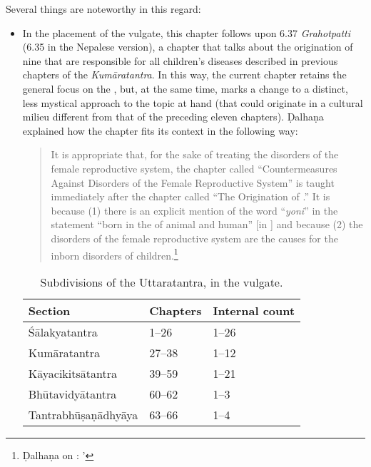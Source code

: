 Several things are noteworthy in this regard:
\begin{itemize}
    \item In the placement of the vulgate, this chapter follows upon 6.37 
    \emph{Grahotpatti} (6.35 in the Nepalese version), a chapter that talks about the 
    origination of nine  that are responsible for all children's 
    diseases described in previous chapters of the \emph{Kumāratantra}. In this way, 
    the 
    current chapter retains the general focus on the , 
    but, at the same time, marks a change to a distinct, less mystical approach to the 
    topic at hand (that could originate in a cultural milieu different from that of the 
    preceding eleven chapters). Ḍalhaṇa explained how the chapter fits its context in the 
    following way: 
    \begin{quote}
        It is appropriate that, for the sake of treating the disorders of
the female reproductive system, the chapter called
“Countermeasures Against Disorders of the Female Reproductive
System” is taught immediately after the chapter called “The
Origination of .”  It is because (1) there is
an explicit mention of the word “\emph{yoni}” in the statement 
“born in the  of animal and human” [in
] and because (2) the disorders of the female
reproductive system are the causes for the inborn disorders of
children.\footnote{Ḍalhaṇa on :
    '
    }
        \end{quote}
   \begin{table}[t] 
       \centering
       \caption{Subdivisions of the Uttaratantra, in the vulgate.}  
       \label{uttara-sections}
       \medskip
       \begin{tabular}{lll}
           \toprule
           Section & Chapters & Internal count  \\
           \midrule
           Śālakyatantra &  1--26   & 1--26\\
           Kumāratantra    & 27--38  & 1--12 \\
           Kāyacikitsātantra & 39--59   & 1--21 \\
           Bhūtavidyātantra  & 60--62   & 1--3\\
           Tantrabhūṣaṇādhyāya & 63--66 & 1--4   \\

\end{tabular}
\end{table}
\end{itemize}
